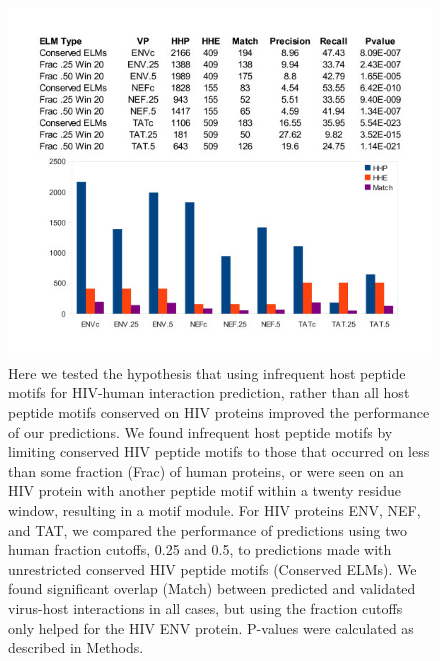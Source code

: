 \begin{figure}
\begin{center}
\includegraphics[scale=2]{figs/medGen_8}
\end{center}
\caption[Evaluating the use of infrequent host peptide motifs for
  HIV-human interaction prediction]{\small Here we tested the
  hypothesis that using infrequent host peptide motifs for HIV-human
  interaction prediction, rather than all host peptide motifs
  conserved on HIV proteins improved the performance of our
  predictions. We found infrequent host peptide motifs by limiting
  conserved HIV peptide motifs to those that occurred on less than some
  fraction (Frac) of human proteins, or were seen on an HIV protein
  with another peptide motif within a twenty residue window, resulting
  in a motif module. For HIV proteins ENV, NEF, and TAT, we compared
  the performance of predictions using two human fraction cutoffs,
  0.25 and 0.5, to predictions made with unrestricted conserved HIV
  peptide motifs (Conserved ELMs). We found significant overlap
  (Match) between predicted and validated virus-host interactions in
  all cases, but using the fraction cutoffs only helped for the HIV ENV
  protein.  P-values were calculated as described in
  Methods. \label{fig:medGen:fig8}}
\end{figure}


